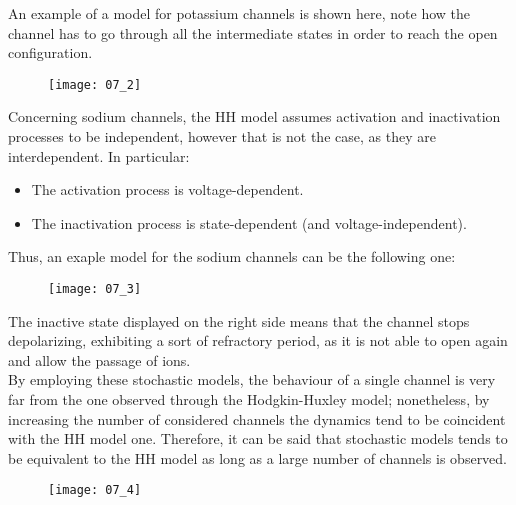An example of a model for potassium channels is shown here, note how the channel has to go through all
the intermediate states in order to reach the open configuration.
\begin{figure}[H]
    \texttt{[image: 07\_2]}
    \centering
\end{figure}
Concerning sodium channels, the HH model assumes activation and inactivation processes to be independent,
however that is not the case, as they are interdependent. In particular:
\begin{itemize}
    \item The activation process is voltage-dependent.
    \item The inactivation process is state-dependent (and voltage-independent).
\end{itemize}
Thus, an exaple model for the sodium channels can be the following one:
\begin{figure}[H]
    \texttt{[image: 07\_3]}
    \centering
\end{figure}
The inactive state displayed on the right side means that the channel stops depolarizing, exhibiting
a sort of refractory period, as it is not able to open again and allow the passage of ions.\\
By employing these stochastic models, the behaviour of a single channel is very far from the one
observed through the Hodgkin-Huxley model; nonetheless, by increasing the number of considered
channels the dynamics tend to be coincident with the HH model one. Therefore, it can be said
that stochastic models tends to be equivalent to the HH model as long as a large number of
channels is observed.
\begin{figure}[H]
    \texttt{[image: 07\_4]}
    \centering
\end{figure}
